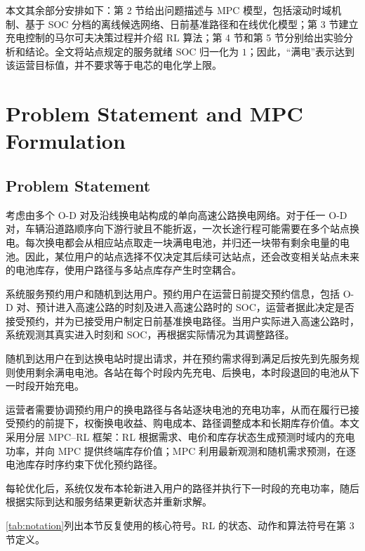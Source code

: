 \documentclass[12pt,a4paper,UTF8]{ctexart}
\begin{document}
本文其余部分安排如下：第 2 节给出问题描述与 MPC 模型，包括滚动时域机制、基于 SOC 分档的离线候选网络、日前基准路径和在线优化模型；第 3 节建立充电控制的马尔可夫决策过程并介绍 RL 算法；第 4 节和第 5 节分别给出实验分析和结论。全文将站点规定的服务就绪 SOC 归一化为 $1$；因此，“满电”表示达到该运营目标值，并不要求等于电芯的电化学上限。







\section{Problem Statement and MPC Formulation}

\subsection{Problem Statement}

考虑由多个 O-D 对及沿线换电站构成的单向高速公路换电网络。对于任一 O-D 对，车辆沿道路顺序向下游行驶且不能折返，一次长途行程可能需要在多个站点换电。每次换电都会从相应站点取走一块满电电池，并归还一块带有剩余电量的电池。因此，某位用户的站点选择不仅决定其后续可达站点，还会改变相关站点未来的电池库存，使用户路径与多站点库存产生时空耦合。

系统服务预约用户和随机到达用户。预约用户在运营日前提交预约信息，包括 O-D 对、预计进入高速公路的时刻及进入高速公路时的 SOC，运营者据此决定是否接受预约，并为已接受用户制定日前基准换电路径。当用户实际进入高速公路时，系统观测其真实进入时刻和 SOC，再根据实际情况为其调整路径。

随机到达用户在到达换电站时提出请求，并在预约需求得到满足后按先到先服务规则使用剩余满电电池。各站在每个时段内先充电、后换电，本时段退回的电池从下一时段开始充电。

运营者需要协调预约用户的换电路径与各站逐块电池的充电功率，从而在履行已接受预约的前提下，权衡换电收益、购电成本、路径调整成本和长期库存价值。本文采用分层 MPC--RL 框架：RL 根据需求、电价和库存状态生成预测时域内的充电功率，并向 MPC 提供终端库存价值；MPC 利用最新观测和随机需求预测，在逐电池库存时序约束下优化预约路径。

每轮优化后，系统仅发布本轮新进入用户的路径并执行下一时段的充电功率，随后根据实际到达和服务结果更新状态并重新求解。

\autoref{tab:notation}列出本节反复使用的核心符号。RL 的状态、动作和算法符号在第 3 节定义。
\end{document}
